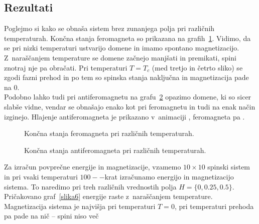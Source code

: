 \documentclass[a4paper,pdftex,10pt]{article}
\numberwithin{figure}{section} %
\begin{document}
\subsection{Rezultati}
Poglejmo si kako se obnaša sistem brez zunanjega polja pri različnih temperaturah. Končna
stanja feromagneta so prikazana na grafih~\ref{slika3}. Vidimo, da se pri nizki 
temperaturi ustvarijo domene in imamo spontano magnetizacijo. Z~naraščanjem temperature 
se domene začnejo manjšati in premikati, spini znotraj nje pa obračati. Pri temperaturi 
$T = T_c$ (med tretjo in četrto sliko) se zgodi fazni prehod in po tem so spinska stanja 
naključna in magnetizacija pade na $0$. \\
Podobno lahko tudi pri antiferomagnetu na grafu~\ref{slika5} opazimo domene, ki so sicer 
slabše vidne, vendar se obnašajo enako kot pri feromagnetu in tudi na enak način izginejo.
Hlajenje antiferomagneta je prikazano v~animaciji , feromagneta pa
.\\
\begin{figure}[H]
    \centering 
    \resizebox{0.32\textwidth}{!}{} 
    \resizebox{0.32\textwidth}{!}{} 
    \resizebox{0.32\textwidth}{!}{} 
    
    \resizebox{0.32\textwidth}{!}{} 
    \resizebox{0.32\textwidth}{!}{} 
    \resizebox{0.32\textwidth}{!}{} 
    \caption{Končna stanja feromagneta pri različnih temperaturah.}
    \label{slika3}
\end{figure}
\begin{figure}[H] 
    \centering 
    \resizebox{0.32\textwidth}{!}{} 
    \resizebox{0.32\textwidth}{!}{} 
    \resizebox{0.32\textwidth}{!}{} 

    \resizebox{0.32\textwidth}{!}{} 
    \resizebox{0.32\textwidth}{!}{} 
    \resizebox{0.32\textwidth}{!}{} 
    \caption{Končna stanja antiferomagneta pri različnih temperaturah.}
    \label{slika5}
\end{figure}
Za izračun povprečne energije in magnetizacije, vzamemo $10 \times 10$ spinski sistem
in pri vsaki temperaturi $100--$krat izračunamo energijo in magnetizacijo sistema. To
naredimo pri treh različnih vrednostih polja $H=\{ 0, 0.25, 0.5 \}$. Pričakovano 
graf~\ref{slika6} energije raste z~naraščanjem temperature. Magnetizacija sistema je 
najvišja pri temperaturi $T=0$, pri temperaturi prehoda pa pade na nič -- spini niso več 
\end{document}
